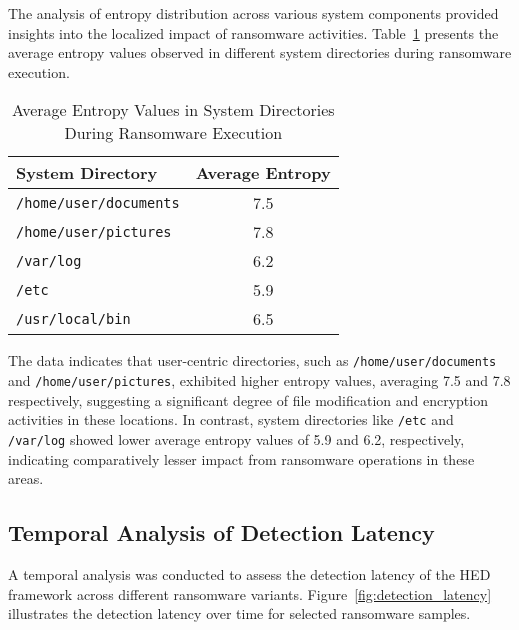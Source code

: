 \documentclass[lettersize,journal]{IEEEtran}
\begin{document}
The analysis of entropy distribution across various system components provided insights into the localized impact of ransomware activities. Table~\ref{tab:entropy_distribution} presents the average entropy values observed in different system directories during ransomware execution.

\begin{table}[h]
	\centering
	\caption{Average Entropy Values in System Directories During Ransomware Execution}
	\label{tab:entropy_distribution}
	\begin{tabular}{|l|c|}
		\hline
		\textbf{System Directory} & \textbf{Average Entropy} \\
		\hline
		\texttt{/home/user/documents} & 7.5 \\
		\texttt{/home/user/pictures} & 7.8 \\
		\texttt{/var/log} & 6.2 \\
		\texttt{/etc} & 5.9 \\
		\texttt{/usr/local/bin} & 6.5 \\
		\hline
	\end{tabular}
\end{table}

The data indicates that user-centric directories, such as \texttt{/home/user/documents} and \texttt{/home/user/pictures}, exhibited higher entropy values, averaging 7.5 and 7.8 respectively, suggesting a significant degree of file modification and encryption activities in these locations. In contrast, system directories like \texttt{/etc} and \texttt{/var/log} showed lower average entropy values of 5.9 and 6.2, respectively, indicating comparatively lesser impact from ransomware operations in these areas.

\subsection{Temporal Analysis of Detection Latency}

A temporal analysis was conducted to assess the detection latency of the HED framework across different ransomware variants. Figure~\ref{fig:detection_latency} illustrates the detection latency over time for selected ransomware samples.
\end{document}
